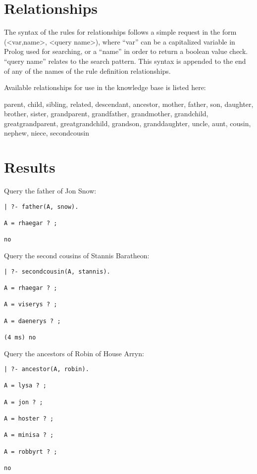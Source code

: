 \documentclass[11pt,letterpaper]{article}
\begin{document}
\section{Relationships}

The syntax of the rules for relationships follows a simple request in the form (<var,name>, <query name>), where ``var'' can be a capitalized variable in Prolog used for searching, or a ``name'' in order to return a boolean value check.
``query name'' relates to the search pattern.
This syntax is appended to the end of any of the names of the rule definition relationships.

Available relationships for use in the knowledge base is listed here:

parent, child, sibling, related, descendant, ancestor, mother, father, son, daughter, brother, sister, grandparent, grandfather, grandmother, grandchild, greatgrandparent, greatgrandchild, grandson, granddaughter, uncle, aunt, cousin, nephew, niece, secondcousin

\clearpage

\section{Results}
Query the father of Jon Snow:
\begin{verbatim}
| ?- father(A, snow).

A = rhaegar ? ;

no
\end{verbatim}

Query the second cousins of Stannis Baratheon:
\begin{verbatim}
| ?- secondcousin(A, stannis).

A = rhaegar ? ;

A = viserys ? ;

A = daenerys ? ;

(4 ms) no
\end{verbatim}


Query the ancestors of Robin of House Arryn:
\begin{verbatim}
| ?- ancestor(A, robin).

A = lysa ? ;

A = jon ? ;

A = hoster ? ;

A = minisa ? ;

A = robbyrt ? ;

no
\end{verbatim}
\end{document}
